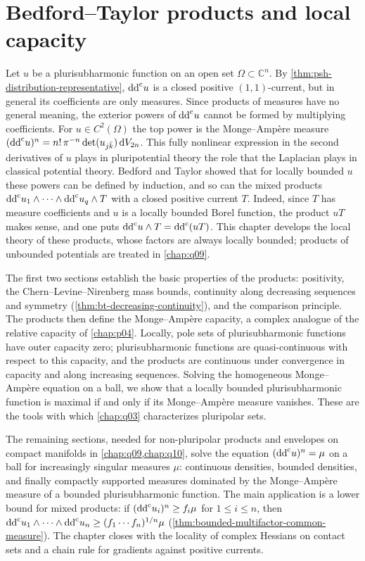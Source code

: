 \chapter{Bedford--Taylor products and local capacity}
\label{chap:q08}

Let $u$ be a plurisubharmonic function on an open set $\Omega\subset\mathbb{C}^n$. By \cref{thm:psh-distribution-representative}, $\mathrm{dd}^{\mathrm{c}} u$ is a closed positive $(1,1)$-current, but in general its coefficients are only measures. Since products of measures have no general meaning, the exterior powers of $\mathrm{dd}^{\mathrm{c}} u$ cannot be formed by multiplying coefficients. For $u\in C^2(\Omega)$ the top power is the Monge--Amp\`ere measure $(\mathrm{dd}^{\mathrm{c}} u)^n=n!\,\pi^{-n}\det(u_{j\bar k})\,\mathrm{d}V_{2n}$. This fully nonlinear expression in the second derivatives of $u$ plays in pluripotential theory the role that the Laplacian plays in classical potential theory. Bedford and Taylor showed that for locally bounded $u$ these powers can be defined by induction, and so can the mixed products $\mathrm{dd}^{\mathrm{c}} u_1\wedge\cdots\wedge\mathrm{dd}^{\mathrm{c}} u_q\wedge T$ with a closed positive current $T$. Indeed, since $T$ has measure coefficients and $u$ is a locally bounded Borel function, the product $uT$ makes sense, and one puts $\mathrm{dd}^{\mathrm{c}} u\wedge T=\mathrm{dd}^{\mathrm{c}}(uT)$. This chapter develops the local theory of these products, whose factors are always locally bounded; products of unbounded potentials are treated in \cref{chap:q09}.

The first two sections establish the basic properties of the products: positivity, the Chern--Levine--Nirenberg mass bounds, continuity along decreasing sequences and symmetry (\cref{thm:bt-decreasing-continuity}), and the comparison principle. The products then define the Monge--Amp\`ere capacity, a complex analogue of the relative capacity of \cref{chap:p04}. Locally, pole sets of plurisubharmonic functions have outer capacity zero; plurisubharmonic functions are quasi-continuous with respect to this capacity, and the products are continuous under convergence in capacity and along increasing sequences. Solving the homogeneous Monge--Amp\`ere equation on a ball, we show that a locally bounded plurisubharmonic function is maximal if and only if its Monge--Amp\`ere measure vanishes. These are the tools with which \cref{chap:q03} characterizes pluripolar sets.

The remaining sections, needed for non-pluripolar products and envelopes on compact manifolds in \cref{chap:q09,chap:q10}, solve the equation $(\mathrm{dd}^{\mathrm{c}} u)^n=\mu$ on a ball for increasingly singular measures $\mu$: continuous densities, bounded densities, and finally compactly supported measures dominated by the Monge--Amp\`ere measure of a bounded plurisubharmonic function. The main application is a lower bound for mixed products: if $(\mathrm{dd}^{\mathrm{c}} u_i)^n\geq f_i\mu$ for $1\le i\le n$, then $\mathrm{dd}^{\mathrm{c}} u_1\wedge\cdots\wedge\mathrm{dd}^{\mathrm{c}} u_n\geq(f_1\cdots f_n)^{1/n}\mu$ (\cref{thm:bounded-multifactor-common-measure}). The chapter closes with the locality of complex Hessians on contact sets and a chain rule for gradients against positive currents.

